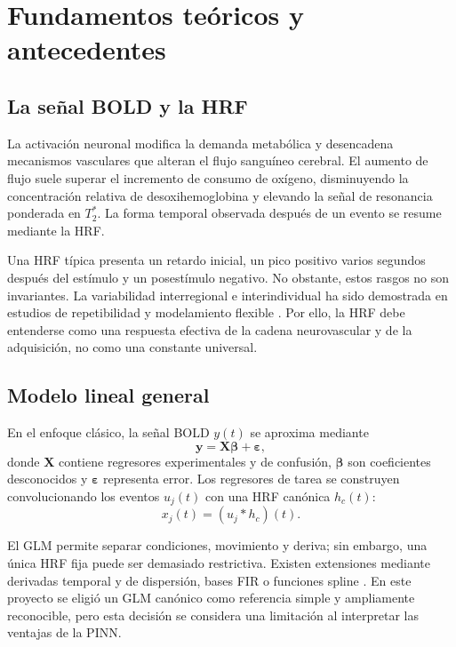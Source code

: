 \chapter{Fundamentos teóricos y antecedentes}

\section{La señal BOLD y la HRF}
La activación neuronal modifica la demanda metabólica y desencadena mecanismos vasculares que alteran el flujo sanguíneo cerebral. El aumento de flujo suele superar el incremento de consumo de oxígeno, disminuyendo la concentración relativa de desoxihemoglobina y elevando la señal de resonancia ponderada en $T_2^*$. La forma temporal observada después de un evento se resume mediante la HRF.

Una HRF típica presenta un retardo inicial, un pico positivo varios segundos después del estímulo y un posestímulo negativo. No obstante, estos rasgos no son invariantes. La variabilidad interregional e interindividual ha sido demostrada en estudios de repetibilidad y modelamiento flexible \citep{Handwerker2004,Neumann2003,Rangaprakash2018}. Por ello, la HRF debe entenderse como una respuesta efectiva de la cadena neurovascular y de la adquisición, no como una constante universal.

\section{Modelo lineal general}
En el enfoque clásico, la señal BOLD $y(t)$ se aproxima mediante
\begin{equation}
  \bm y = \bm X\bm\beta + \bm\varepsilon,
  \label{eq:glm}
\end{equation}
donde $\bm X$ contiene regresores experimentales y de confusión, $\bm\beta$ son coeficientes desconocidos y $\bm\varepsilon$ representa error. Los regresores de tarea se construyen convolucionando los eventos $u_j(t)$ con una HRF canónica $h_c(t)$:
\begin{equation}
  x_j(t) = (u_j*h_c)(t).
\end{equation}

El GLM permite separar condiciones, movimiento y deriva; sin embargo, una única HRF fija puede ser demasiado restrictiva. Existen extensiones mediante derivadas temporal y de dispersión, bases FIR o funciones spline \citep{Glover1999,Lindquist2009}. En este proyecto se eligió un GLM canónico como referencia simple y ampliamente reconocible, pero esta decisión se considera una limitación al interpretar las ventajas de la PINN.

